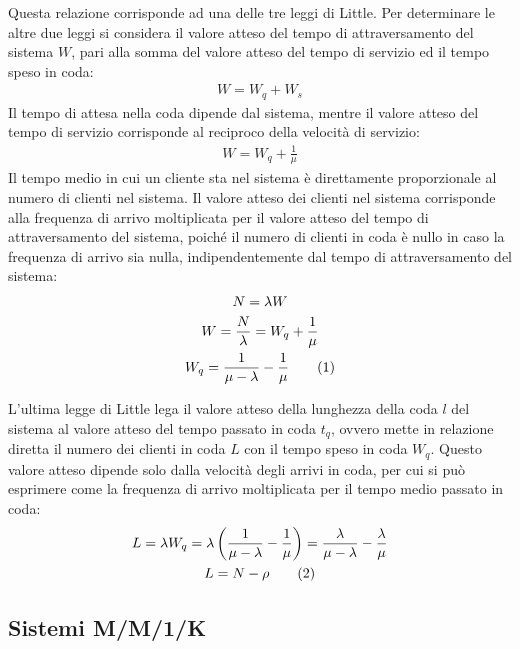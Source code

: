 \documentclass{article}
\newcommand{\tageq}{\tag{\stepcounter{equation}\theequation}}
\numberwithin{equation}{subsection}
\begin{document}
Questa relazione corrisponde ad una delle tre leggi di Little. 
Per determinare le altre due leggi si considera il valore atteso del tempo di attraversamento del sistema $W$, pari alla somma del valore atteso del tempo di 
servizio ed il tempo speso in coda:
\begin{gather}
    W=W_q+W_s
\end{gather}
Il tempo di attesa nella coda dipende dal sistema, mentre il valore atteso del tempo di servizio corrisponde al reciproco della velocità di servizio:
\begin{gather*}
    W=W_q+\displaystyle\frac{1}{\mu}
\end{gather*}
Il tempo medio in cui un cliente sta nel sistema è direttamente proporzionale al numero di clienti nel sistema. Il valore atteso dei clienti nel sistema corrisponde alla 
frequenza di arrivo moltiplicata per il valore atteso del tempo di attraversamento del sistema, poiché il numero di clienti in coda è nullo in caso la frequenza di arrivo 
sia nulla, indipendentemente dal tempo di attraversamento del sistema:
\begin{gather*}
    N=\lambda W\\
    W =\displaystyle\frac{N}{\lambda}=W_q+\frac{1}{\mu}\\
    W_q=\displaystyle\frac{1}{\mu-\lambda}-\frac{1}{\mu}\tageq
\end{gather*}

L'ultima legge di Little lega il valore atteso della lunghezza della coda $l$ del sistema al valore atteso del tempo passato in coda $t_q$, ovvero mette in relazione diretta il numero 
dei clienti in coda $L$ con il tempo speso in coda $W_q$. Questo valore atteso dipende solo dalla velocità degli arrivi in coda, per cui si può esprimere come la frequenza di 
arrivo moltiplicata per il tempo medio passato in coda:
\begin{gather*}
    L=\lambda W_q=\lambda\left(\displaystyle\frac{1}{\mu-\lambda}-\frac{1}{\mu}\right)=\frac{\lambda}{\mu-\lambda}-\frac{\lambda}{\mu}\\
    L=N-\rho\tageq
\end{gather*}

\subsection{Sistemi M/M/1/K}
\end{document}
